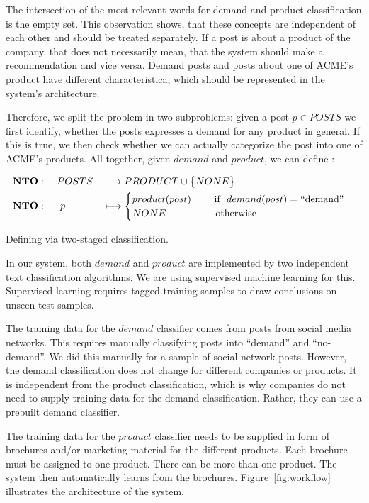 The intersection of the most relevant words for demand and product classification is the empty set.
This observation shows, that these concepts are independent of each other and should be treated separately.
If a post is about a product of the company, that does not necessarily mean, that the system should make a recommendation and vice versa.
Demand posts and posts about one of ACME's product have different characteristica, which should be represented in the system's architecture.

Therefore, we split the \nto problem in two subproblems: given a post $p \in POSTS$ we first identify, whether the posts expresses a demand for any product in general.
If this is true, we then check whether we can actually categorize the post into one of ACME's products.
All together, given $demand$ and $product$, we can define \nto:

\begin{equationBlock}
	\begin{alignat*}{3}
	  &\mathbf{NTO}: && ~POSTS && \longrightarrow PRODUCT \cup \big\{ NONE \big\} \\
	  &\mathbf{NTO}: && ~~p   && \longmapsto \begin{cases}
		    product(post)~~~~~~~\text{if }~demand(post) = \operatorname{``demand''} \\
		    NONE~~~~~~~~~~~~~~~\text{otherwise}
	   \end{cases}
	\end{alignat*}
	\caption{Defining \nto via two-staged classification.}
\end{equationBlock}

In our system, both $demand$ and $product$ are implemented by two independent text classification algorithms.
We are using supervised machine learning for this.
Supervised learning requires tagged training samples to draw conclusions on unseen test samples.

The training data for the $demand$ classifier comes from posts from social media networks.
This requires manually classifying posts into ``demand'' and ``no-demand''.
We did this manually for a sample of social network posts.
However, the demand classification does not change for different companies or products.
It is independent from the product classification, which is why companies do not need to supply training data for the demand classification.
Rather, they can use a prebuilt demand classifier.

The training data for the $product$ classifier needs to be supplied in form of brochures and/or marketing material for the different products.
Each brochure must be assigned to one product.
There can be more than one product.
The system then automatically learns from the brochures.
Figure~\ref{fig:workflow} illustrates the architecture of the system. 

